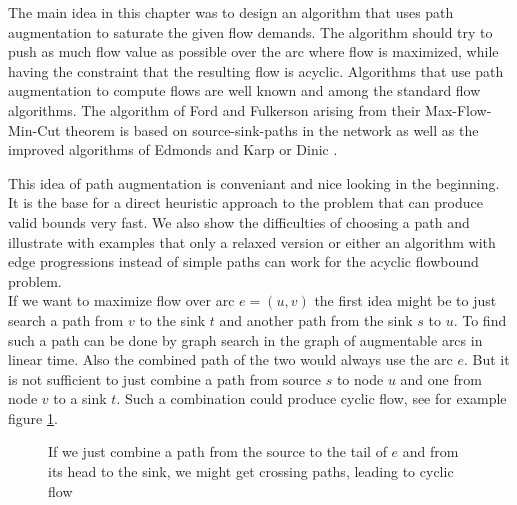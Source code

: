 The main idea in this chapter was to design an algorithm that uses path augmentation to saturate the given flow 
demands. 
The algorithm should try to push as much flow value as possible over the arc where flow is maximized, while having the 
constraint that the resulting flow is acyclic. %
Algorithms that use path augmentation to compute flows are well known and among the standard flow algorithms. The 
algorithm of Ford and Fulkerson \cite{Ford-Fulkerson_algo} arising from their Max-Flow-Min-Cut theorem is based on 
source-sink-paths in the network as well as the improved algorithms of Edmonds and Karp \cite{EdmondsKarp1972} or Dinic 
\cite{Dinic1970}. 

This idea of path augmentation is conveniant and nice looking in the beginning. It is the base for a direct heuristic 
approach to the problem that can produce valid bounds very fast. We also show the difficulties of choosing a path and 
illustrate with examples that only a relaxed version or either an algorithm with edge progressions instead of simple 
paths can work for the acyclic flowbound problem.\\

If we want to maximize flow over arc $e=(u,v)$ the first idea might be to just search a path from $v$ to the sink $t$ 
and another path from the sink $s$ to $u$. To find such a path can be done by graph search in the graph of augmentable 
arcs in linear time. Also the combined path of the two would always use the arc $e$.
But it is not sufficient to just combine a path from source $s$ to node 
$u$ and one from node $v$ to a sink $t$. Such a combination could produce cyclic flow, see for example figure 
\ref{bild:cycleFromCombinedPaths}. %

\begin{figure}[h!]
\centering
{}
\caption{If we just combine a path from the source to the tail of $e$ and from its head to the sink, we might get 
crossing paths, leading to cyclic flow}
 \label{bild:cycleFromCombinedPaths}
\end{figure}

